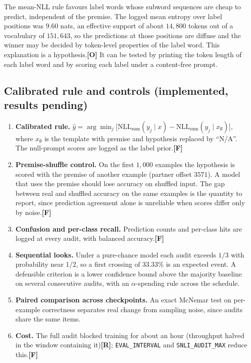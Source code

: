 \documentclass[11pt,a4paper]{article}
\newcommand{\sR}{\textbf{[R]}}
\newcommand{\sF}{\textbf{[F]}}
\newcommand{\sO}{\textbf{[O]}}
\begin{document}
The mean-NLL rule favours label words whose subword sequences are cheap to predict, independent of the premise. The logged mean entropy over label positions was $9.60$ nats, an effective support of about $14{,}800$ tokens out of a vocabulary of $151{,}643$, so the predictions at those positions are diffuse and the winner may be decided by token-level properties of the label word. This explanation is a hypothesis.\sO{} It can be tested by printing the token length of each label word and by scoring each label under a content-free prompt.

\subsection{Calibrated rule and controls (implemented, results pending)}
\begin{enumerate}[leftmargin=*]
    \item \textbf{Calibrated rule.} $\hat y = \arg\min_j \big[\mathrm{NLL}_{\text{sum}}(y_j \mid x) - \mathrm{NLL}_{\text{sum}}(y_j \mid x_\emptyset)\big]$, where $x_\emptyset$ is the template with premise and hypothesis replaced by ``N/A''. The null-prompt scores are logged as the label prior.\sF{}
    \item \textbf{Premise-shuffle control.} On the first $1{,}000$ examples the hypothesis is scored with the premise of another example (partner offset $3571$). A model that uses the premise should lose accuracy on shuffled input. The gap between real and shuffled accuracy on the same examples is the quantity to report, since prediction agreement alone is unreliable when scores differ only by noise.\sF{}
    \item \textbf{Confusion and per-class recall.} Prediction counts and per-class hits are logged at every audit, with balanced accuracy.\sF{}
    \item \textbf{Sequential looks.} Under a pure-chance model each audit exceeds $1/3$ with probability near $1/2$, so a first crossing of $33.33\%$ is an expected event. A defensible criterion is a lower confidence bound above the majority baseline on several consecutive audits, with an $\alpha$-spending rule across the schedule.
    \item \textbf{Paired comparison across checkpoints.} An exact McNemar test on per-example correctness separates real change from sampling noise, since audits share the same items.
    \item \textbf{Cost.} The full audit blocked training for about an hour (throughput halved in the window containing it)\sR{}; \texttt{EVAL\_INTERVAL} and \texttt{SNLI\_AUDIT\_MAX} reduce this.\sF{}
\end{enumerate}
\end{document}
